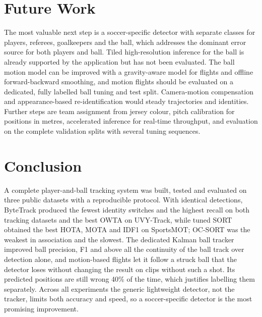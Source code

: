 \documentclass[conference]{IEEEtran}
\begin{document}
\section{Future Work}
The most valuable next step is a soccer-specific detector with separate classes
for players, referees, goalkeepers and the ball, which addresses the dominant
error source for both players and ball. Tiled high-resolution inference for the
ball is already supported by the application but has not been evaluated. The
ball motion model can be improved with a gravity-aware model for flights and
offline forward-backward smoothing, and motion flights should be evaluated on a
dedicated, fully labelled ball tuning and test split. Camera-motion compensation and appearance-based
re-identification would steady trajectories and
identities. Further steps are team assignment from jersey colour, pitch
calibration for positions in metres, accelerated inference for real-time
throughput, and evaluation on the complete validation splits with several tuning
sequences.

\section{Conclusion}
A complete player-and-ball tracking system was built, tested and evaluated on
three public datasets with a reproducible protocol. With identical detections,
ByteTrack produced the fewest identity switches and the highest recall on both
tracking datasets and the best OWTA on UVY-Track, while tuned SORT obtained the
best HOTA, MOTA and IDF1 on SportsMOT; OC-SORT was the weakest in association and
the slowest. The dedicated Kalman ball tracker improved ball precision, F1 and
above all the continuity of the ball track over detection alone, and motion-based
flights let it follow a struck ball that the detector loses without changing the
result on clips without such a shot. Its predicted positions are still wrong 40\%
of the time, which justifies labelling them separately. Across all experiments the generic lightweight detector, not the
tracker, limits both accuracy and speed, so a soccer-specific detector is the
most promising improvement.
\end{document}

